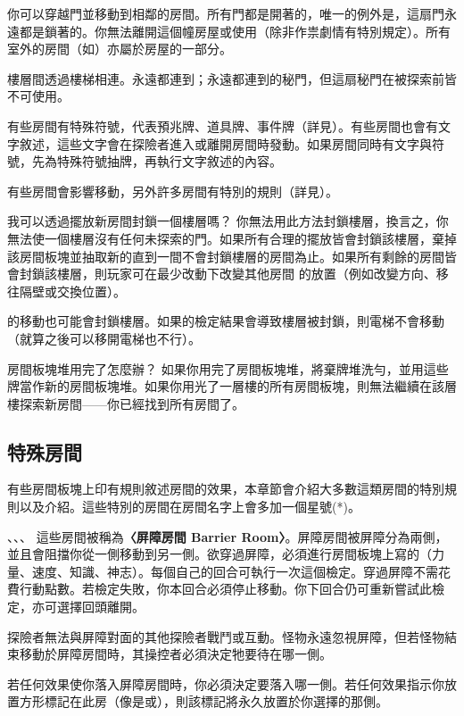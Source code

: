 你可以穿越門並移動到相鄰的房間。所有門都是開著的，唯一的例外是，這扇門永遠都是鎖著的。你無法離開這個幢房屋或使用（除非作祟劇情有特別規定）。所有室外的房間（如）亦屬於房屋的一部分。

樓層間透過樓梯相連。永遠都連到；永遠都連到的秘門，但這扇秘門在被探索前皆不可使用。

有些房間有特殊符號，代表預兆牌、道具牌、事件牌（詳見）。有些房間也會有文字敘述，這些文字會在探險者進入或離開房間時發動。如果房間同時有文字與符號，先為特殊符號抽牌，再執行文字敘述的內容。

有些房間會影響移動，另外許多房間有特別的規則（詳見）。

\begin{RuleBox}{我可以透過擺放新房間封鎖一個樓層嗎？}
  你無法用此方法封鎖樓層，換言之，你無法使一個樓層沒有任何未探索的門。如果所有合理的擺放皆會封鎖該樓層，棄掉該房間板塊並抽取新的直到一間不會封鎖樓層的房間為止。如果所有剩餘的房間皆會封鎖該樓層，則玩家可在最少改動下改變其他房間 的放置（例如改變方向、移往隔壁或交換位置）。

  的移動也可能會封鎖樓層。如果的檢定結果會導致樓層被封鎖，則電梯不會移動（就算之後可以移開電梯也不行）。
\end{RuleBox}

\begin{RuleBox}{房間板塊堆用完了怎麼辦？}
  如果你用完了房間板塊堆，將棄牌堆洗勻，並用這些牌當作新的房間板塊堆。如果你用光了一層樓的所有房間板塊，則無法繼續在該層樓探索新房間——你已經找到所有房間了。
\end{RuleBox}


\subsection{特殊房間} \label{ssec:special-room}

有些房間板塊上印有規則敘述房間的效果，本章節會介紹大多數這類房間的特別規則以及介紹。這些特別的房間在房間名字上會多加一個星號(*)。

\begin{RuleBox}{、、、}
  這些房間被稱為\textbf{〈屏障房間 Barrier Room〉}。屏障房間被屏障分為兩側，並且會阻擋你從一側移動到另一側。欲穿過屏障，必須進行房間板塊上寫的\textbf{}（力量、速度、知識、神志）。每個自己的回合可執行一次這個檢定。穿過屏障不需花費行動點數。若檢定失敗，你本回合必須停止移動。你下回合仍可重新嘗試此檢定，亦可選擇回頭離開。

  探險者無法與屏障對面的其他探險者戰鬥或互動。怪物永遠忽視屏障，但若怪物結束移動於屏障房間時，其操控者必須決定牠要待在哪一側。

  若任何效果使你落入屏障房間時，你必須決定要落入哪一側。若任何效果指示你放置方形標記在此房（像是或），則該標記將永久放置於你選擇的那側。
\end{RuleBox}

